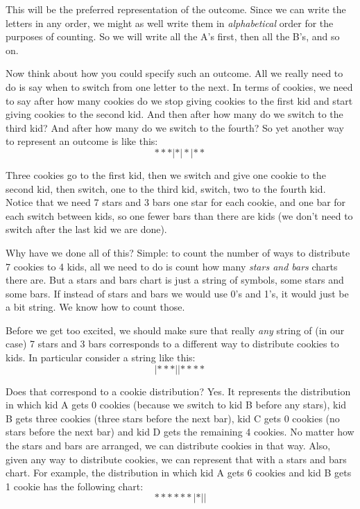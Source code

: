 \documentclass[10pt,]{book}
\theoremstyle{plain}
\theoremstyle{definition}
\theoremstyle{definition}
\theoremstyle{definition}
\numberwithin{equation}{section}
\begin{document}
This will be the preferred representation of the outcome. Since we can write the letters in any order, we might as well write them in \emph{alphabetical} order for the purposes of counting. So we will write all the A's first, then all the B's, and so on.
%
\par

Now think about how you could specify such an outcome. All we really need to do is say when to switch from one letter to the next. In terms of cookies, we need to say after how many cookies do we stop giving cookies to the first kid and start giving cookies to the second kid. And then after how many do we switch to the third kid? And after how many do we switch to the fourth? So yet another way to represent an outcome is like this:
\begin{equation*}
  ***|*|*|**
\end{equation*}
%
\par

Three cookies go to the first kid, then we switch and give one cookie to the second kid, then switch, one to the third kid, switch, two to the fourth kid. Notice that we need 7 stars and 3 bars \textendash{} one star for each cookie, and one bar for each switch between kids, so one fewer bars than there are kids (we don't need to switch after the last kid \textendash{} we are done).
%
\par

Why have we done all of this? Simple: to count the number of ways to distribute 7 cookies to 4 kids, all we need to do is count how many \emph{stars and bars} charts there are. But a stars and bars chart is just a string of symbols, some stars and some bars. If instead of stars and bars we would use 0's and 1's, it would just be a bit string. We know how to count those.
%
\par

Before we get too excited, we should make sure that really \emph{any} string of (in our case) 7 stars and 3 bars corresponds to a different way to distribute cookies to kids. In particular consider a string like this:
\begin{equation*}
  |***||****
\end{equation*}
%
\par

Does that correspond to a cookie distribution? Yes. It represents the distribution in which kid A gets 0 cookies (because we switch to kid B before any stars), kid B gets three cookies (three stars before the next bar), kid C gets 0 cookies (no stars before the next bar) and kid D gets the remaining 4 cookies. No matter how the stars and bars are arranged, we can distribute cookies in that way. Also, given any way to distribute cookies, we can represent that with a stars and bars chart. For example, the distribution in which kid A gets 6 cookies and kid B gets 1 cookie has the following chart:
\begin{equation*}
  ******|*||
\end{equation*}
%
\par
\end{document}
